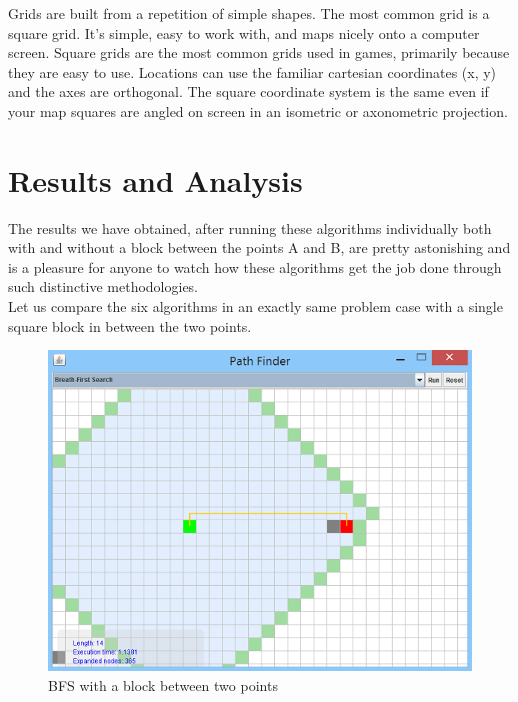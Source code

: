 \documentclass[a4paper]{article}
\begin{document}
\noindent Grids are built from a repetition of simple shapes. The most common grid is a square grid. It’s simple, easy to work with, and maps nicely onto a computer screen. Square grids are the most common grids used in games, primarily because they are easy to use. Locations can use the familiar cartesian coordinates (x, y) and the axes are orthogonal. The square coordinate system is the same even if your map squares are angled on screen in an isometric or axonometric projection.


\section{Results and Analysis}

The results we have obtained, after running these algorithms individually both with and without a block between the points A and B, are pretty astonishing and is a pleasure for anyone to watch how these algorithms get the job done through such distinctive methodologies.\\

\noindent Let us compare the six algorithms in an exactly same problem case with a single square block in between the two points.

\begin{figure}[h!]
  \centering
    \includegraphics[scale=.9]{images/bfs1.png}
  \caption{BFS with a block between two points}
\end{figure}
\end{document}
